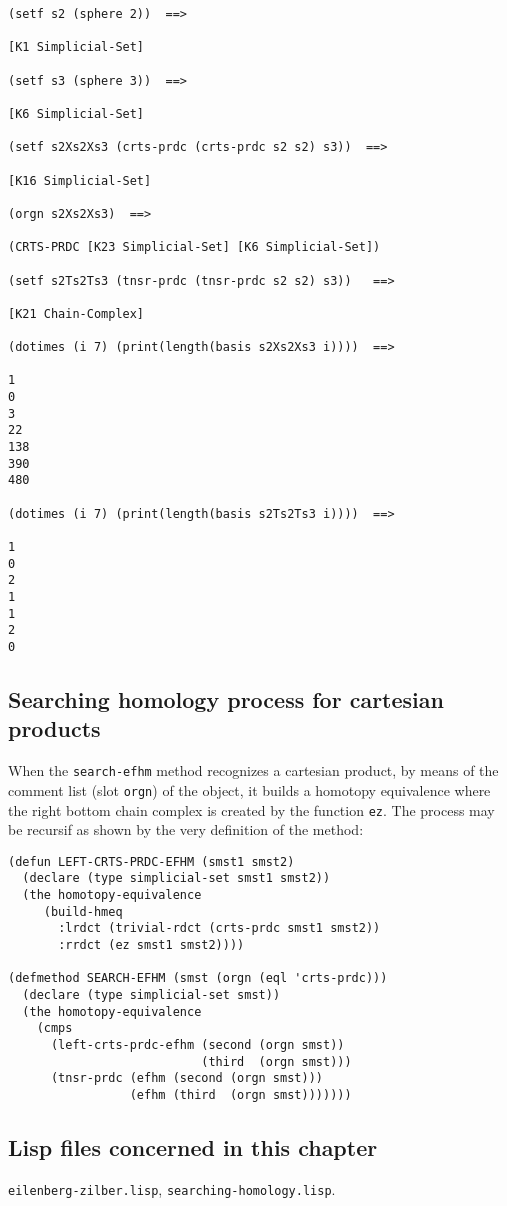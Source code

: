 {\footnotesize\begin{verbatim}
(setf s2 (sphere 2))  ==>

[K1 Simplicial-Set]

(setf s3 (sphere 3))  ==>

[K6 Simplicial-Set]

(setf s2Xs2Xs3 (crts-prdc (crts-prdc s2 s2) s3))  ==>

[K16 Simplicial-Set]

(orgn s2Xs2Xs3)  ==>

(CRTS-PRDC [K23 Simplicial-Set] [K6 Simplicial-Set])

(setf s2Ts2Ts3 (tnsr-prdc (tnsr-prdc s2 s2) s3))   ==>

[K21 Chain-Complex]

(dotimes (i 7) (print(length(basis s2Xs2Xs3 i))))  ==>

1 
0 
3 
22 
138 
390 
480 

(dotimes (i 7) (print(length(basis s2Ts2Ts3 i))))  ==>

1 
0 
2 
1 
1 
2 
0 
\end{verbatim}}

\newpage

\subsection {Searching homology process for cartesian products}

When the {\tt search-efhm} method recognizes a cartesian product,
by means of the comment list (slot {\tt orgn}) of the object, it builds a homotopy equivalence where 
the right bottom chain complex is created by the function {\tt ez}. 
The process may be recursif as shown by the very definition of the method:
\vskip 0.35cm
{\footnotesize\begin{verbatim}
(defun LEFT-CRTS-PRDC-EFHM (smst1 smst2)
  (declare (type simplicial-set smst1 smst2))
  (the homotopy-equivalence
     (build-hmeq
       :lrdct (trivial-rdct (crts-prdc smst1 smst2))
       :rrdct (ez smst1 smst2))))

(defmethod SEARCH-EFHM (smst (orgn (eql 'crts-prdc)))
  (declare (type simplicial-set smst))
  (the homotopy-equivalence
    (cmps
      (left-crts-prdc-efhm (second (orgn smst)) 
                           (third  (orgn smst)))
      (tnsr-prdc (efhm (second (orgn smst)))
                 (efhm (third  (orgn smst)))))))
\end{verbatim}}

\subsection* {Lisp files concerned in this chapter}

{\tt eilenberg-zilber.lisp}, {\tt searching-homology.lisp}.

